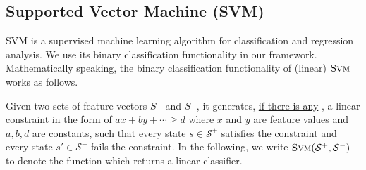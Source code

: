 \subsection{Supported Vector Machine (SVM)}
\label{subsec:svm}
\textsc{SVM} is a supervised machine learning algorithm for classification and regression analysis. 
We use its binary classification functionality in our framework. 
Mathematically speaking, the binary classification functionality of (linear) $\textsc{Svm}$ works as follows. 

Given two sets of feature vectors $S^+$ and $S^-$, it generates, 
\underline{if there is any} , 
a linear constraint in the form of $ax + by + \cdots \geq d$ where $x$ and $y$ are feature values and $a, b, d$ are constants, 
such that every state $s \in \mathcal{S}^+$ satisfies the constraint and every state $s' \in \mathcal{S}^-$ fails the constraint. 
In the following, we write $\textsc{Svm}(\mathcal{S}^+, \mathcal{S}^-)$ to denote the function which returns a linear classifier.


